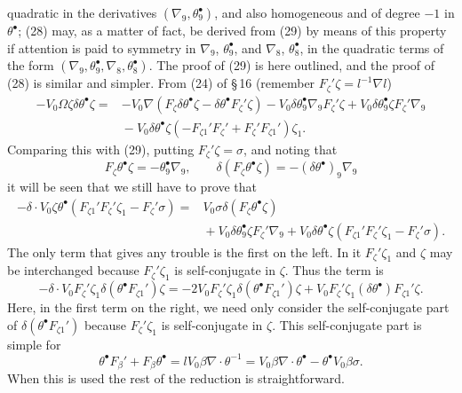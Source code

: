 \documentclass[11pt]{article}
\begin{document}
quadratic in the derivatives $(\nabla_9,\theta^\bullet_9)$, and also homogeneous and of degree $-1$ in $\theta^\bullet$; (28) may, as a matter of fact, be derived from (29) by means of this property if attention is paid to symmetry in $\nabla_9$, $\theta^\bullet_9$, and $\nabla_8$, $\theta^\bullet_8$, in the quadratic terms of the form $(\nabla_9,\theta^\bullet_9,\nabla_8,\theta^\bullet_8)$. The proof of (29) is here outlined, and the proof of (28) is similar and simpler. From (24) of \S\,16 (remember $F_\zeta'\zeta=l^{-1}\nabla l$)
\[
  \begin{aligned}
  -V_0\Omega\zeta\delta\theta^\bullet\zeta={}&-V_0\nabla(F_\zeta\delta\theta^\bullet\zeta-\delta\theta^\bullet F_\zeta'\zeta)
    -V_0\delta\theta^\bullet_9\nabla_9F_\zeta'\zeta+V_0\delta\theta^\bullet_9\zeta F_\zeta'\nabla_9\\
   &{}-V_0\delta\theta^\bullet\zeta(-F_{\zeta1}'F_\zeta'+F_\zeta'F_{\zeta1}')\zeta_1.
  \end{aligned}
\]
Comparing this with (29), putting $F_\zeta'\zeta=\sigma$, and noting that
\[
  F_\zeta\theta^\bullet\zeta=-\theta^\bullet_9\nabla_9,\qquad
  \delta(F_\zeta\theta^\bullet\zeta)=-(\delta\theta^\bullet)_9\nabla_9
  \tag{30}
\]
it will be seen that we still have to prove that
\[
  \begin{aligned}
  -\delta\mathbin{\cdot}V_0\zeta\theta^\bullet(F_{\zeta1}'F_\zeta'\zeta_1-F_\zeta'\sigma)
  ={}&V_0\sigma\delta(F_\zeta\theta^\bullet\zeta)\\
   &{}+V_0\delta\theta^\bullet_9\zeta F_\zeta'\nabla_9
    +V_0\delta\theta^\bullet\zeta(F_{\zeta1}'F_\zeta'\zeta_1-F_\zeta'\sigma).
  \end{aligned}
\]
The only term that gives any trouble is the first on the left. In it $F_\zeta'\zeta_1$ and $\zeta$ may be interchanged because $F_\zeta'\zeta_1$ is self-conjugate in $\zeta$. Thus the term is
\[
  -\delta\mathbin{\cdot}V_0F_\zeta'\zeta_1\delta(\theta^\bullet F_{\zeta1}')\zeta
  =-2V_0F_\zeta'\zeta_1\delta(\theta^\bullet F_{\zeta1}')\zeta+V_0F_\zeta'\zeta_1(\delta\theta^\bullet)F_{\zeta1}'\zeta.
\]
Here, in the first term on the right, we need only consider the self-conjugate part of $\delta(\theta^\bullet F_{\zeta1}')$ because $F_\zeta'\zeta_1$ is self-conjugate in $\zeta$. This self-conjugate part is simple for
\[
  \theta^\bullet F_\beta'+F_\beta\theta^\bullet=lV_0\beta\nabla\mathbin{\cdot}\theta^{-1}=V_0\beta\nabla\mathbin{\cdot}\theta^\bullet-\theta^\bullet V_0\beta\sigma.
\]
When this is used the rest of the reduction is straightforward.
\end{document}
